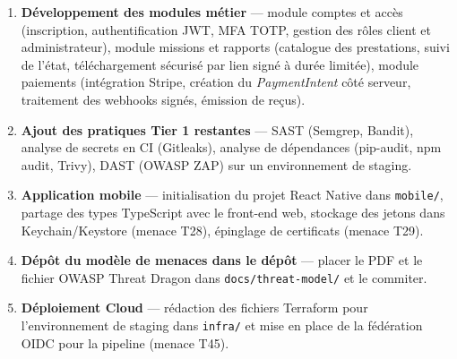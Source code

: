 \documentclass[11pt,a4paper]{article}
\begin{document}
\begin{enumerate}
  \item \textbf{Développement des modules métier} --- module comptes et accès (inscription,
    authentification JWT, MFA TOTP, gestion des rôles client et administrateur), module
    missions et rapports (catalogue des prestations, suivi de l'état, téléchargement sécurisé
    par lien signé à durée limitée), module paiements (intégration Stripe, création du
    \textit{PaymentIntent} côté serveur, traitement des webhooks signés, émission de reçus).

  \item \textbf{Ajout des pratiques Tier 1 restantes} --- SAST (Semgrep, Bandit), analyse
    de secrets en CI (Gitleaks), analyse de dépendances (pip-audit, npm audit, Trivy),
    DAST (OWASP ZAP) sur un environnement de staging.

  \item \textbf{Application mobile} --- initialisation du projet React Native dans
    \texttt{mobile/}, partage des types TypeScript avec le front-end web, stockage des
    jetons dans Keychain/Keystore (menace T28), épinglage de certificats (menace T29).

  \item \textbf{Dépôt du modèle de menaces dans le dépôt} --- placer le PDF et le fichier
    OWASP Threat Dragon dans \texttt{docs/threat-model/} et le commiter.

  \item \textbf{Déploiement Cloud} --- rédaction des fichiers Terraform pour l'environnement
    de staging dans \texttt{infra/} et mise en place de la fédération OIDC pour la pipeline
    (menace T45).
\end{enumerate}
\end{document}
